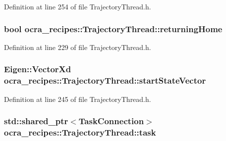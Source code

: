 Definition at line 254 of file Trajectory\+Thread.\+h.

\subsubsection[{\texorpdfstring{returning\+Home}{returningHome}}]{\setlength{\rightskip}{0pt plus 5cm}bool ocra\+\_\+recipes\+::\+Trajectory\+Thread\+::returning\+Home\hspace{0.3cm}{\ttfamily [protected]}}\hypertarget{classocra__recipes_1_1TrajectoryThread_a3835f5a143e350d53786d4469fce09f1}{}\label{classocra__recipes_1_1TrajectoryThread_a3835f5a143e350d53786d4469fce09f1}


Definition at line 229 of file Trajectory\+Thread.\+h.

\subsubsection[{\texorpdfstring{start\+State\+Vector}{startStateVector}}]{\setlength{\rightskip}{0pt plus 5cm}Eigen\+::\+Vector\+Xd ocra\+\_\+recipes\+::\+Trajectory\+Thread\+::start\+State\+Vector\hspace{0.3cm}{\ttfamily [protected]}}\hypertarget{classocra__recipes_1_1TrajectoryThread_a28661ee4345695282b2a45baf33bd2af}{}\label{classocra__recipes_1_1TrajectoryThread_a28661ee4345695282b2a45baf33bd2af}


Definition at line 245 of file Trajectory\+Thread.\+h.

\subsubsection[{\texorpdfstring{task}{task}}]{\setlength{\rightskip}{0pt plus 5cm}std\+::shared\+\_\+ptr$<${\bf Task\+Connection}$>$ ocra\+\_\+recipes\+::\+Trajectory\+Thread\+::task\hspace{0.3cm}{\ttfamily [protected]}}\hypertarget{classocra__recipes_1_1TrajectoryThread_a3637e00b27ab63ecc48f813013626cba}{}\label{classocra__recipes_1_1TrajectoryThread_a3637e00b27ab63ecc48f813013626cba}



